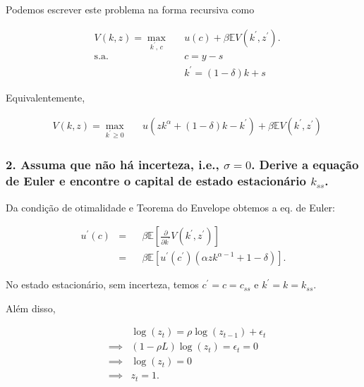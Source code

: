 \documentclass{article}
\begin{document}
Podemos escrever este problema na forma recursiva como

\begin{equation}
\begin{aligned}
 & V(k,z) = \max_{k^{\prime}, \, c} & & u(c) + \beta \mathbb{E} V(k^{\prime},z^{\prime}). \\
 & \text{s.a.} & & c = y - s \\
 &             & & k^{\prime} = (1-\delta) k + s
\end{aligned}
\end{equation}


Equivalentemente,

\begin{equation}
\begin{aligned}
 & V(k,z) = \max_{k^{\prime} \geq 0} & & u(zk^\alpha + (1-\delta)k - k^{\prime}) + \beta \mathbb{E} V(k^{\prime},z^{\prime})
\end{aligned}
\end{equation}


\subsubsection*{2. Assuma que não há incerteza, i.e., $\sigma = 0$. Derive a equação de Euler e encontre o capital de estado estacionário $k_{ss}$.}



Da condição de otimalidade e Teorema do Envelope obtemos a eq. de Euler:


\begin{equation}
\begin{aligned}
u^{\prime}(c) & = & & \beta  \mathbb{E} [ \frac{\partial}{\partial k^{\prime}} V(k^{\prime},z^{\prime})] \\
      & = & & \beta  \mathbb{E} [u^{\prime}(c^{\prime}) (\alpha z k^{\alpha-1} + 1 - \delta)].
\end{aligned}
\end{equation}


No estado estacionário, sem incerteza, temos $c^{\prime}=c=c_{ss}$ e $k^{\prime}=k=k_{ss}$. 

Além disso, 

\begin{equation}
\begin{aligned}
&  &\log(z_t)  = \rho \log(z_{t-1}) + \epsilon_t \\
&     \implies  & (1-\rho L) \log(z_t) = \epsilon_t = 0 \\
&     \implies  &  \log(z_t) =  0 \\
&     \implies &  z_t =  1. \\
\end{aligned}
\end{equation}
\end{document}
